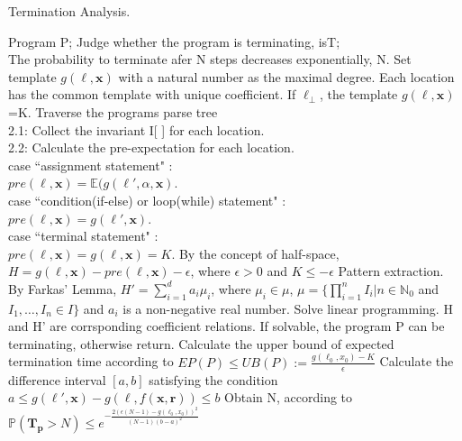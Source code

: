 \documentclass[runningheads]{llncs}
\begin{document}
\begin{algorithm}[htb]  
	\caption{Termination Analysis.}  
	\label{TA}  
	\begin{algorithmic}[1]  
		\REQUIRE 
		Program P; 
		\ENSURE  
		Judge whether the program is terminating, isT;\\
		The probability to terminate afer N steps decreases exponentially, N.
		\STATE Set template $g(\ell,\boldsymbol{x})$ with a natural number as the maximal degree. Each location has the common template with unique coefficient. If $\ell_{\bot}$, the template $g(\ell,\boldsymbol{x})$=K.
		\STATE Traverse the programs parse tree \\
		2.1: Collect the invariant I[ ] for each location.\\
		2.2: Calculate the pre-expectation for each location.\\
		\quad \quad case ``assignment statement" :\\
		\quad \quad \quad \quad $pre(\ell,\boldsymbol{x})= \mathbb{E}(g(\ell',\alpha,\boldsymbol{x})$.\\
		\quad \quad case ``condition(if-else) or loop(while) statement" :\\
		\quad \quad \quad \quad $pre(\ell,\boldsymbol{x})=g(\ell',\boldsymbol{x})$.\\
		\quad \quad case ``terminal statement" :\\
		\quad \quad \quad \quad $pre(\ell,\boldsymbol{x})=g(\ell,\boldsymbol{x})=K$.
		\STATE By the concept of half-space, $H=g(\ell,\boldsymbol{x})-pre(\ell,\boldsymbol{x})-\epsilon$, where $\epsilon >0$ and $K \leq -\epsilon$
		\STATE Pattern extraction. By Farkas' Lemma, $H'=\sum\limits_{i=1}^{d} a_i \mu_i$, where $\mu_i \in \mu$, $\mu=\{\prod\limits_{i=1}^{n} I_i | n\in\mathbb{N}_0$ and $ I_1,\dots,I_n \in I\}$ and $a_i$ is a non-negative real number.
		\STATE Solve linear programming. H and H' are corrsponding coefficient relations. If solvable, the program P can be terminating, otherwise return.
		\STATE Calculate the upper bound of expected termination time according to $EP(P)\leq UB(P):=\frac{g(\ell_0,x_0)-K}{\epsilon}$
		\STATE Calculate the difference interval $[a,b]$ satisfying the condition $a\leq g(\ell',\boldsymbol{x})-g(\ell,f(\boldsymbol{x},\boldsymbol{r}))\leq b$
		\STATE Obtain N, according to $\mathbb{P}(\bm{T_p} > N) \leq e^{-\frac{2(\epsilon(N-1)-g(\ell_0,x_0))^2}{(N-1)(b-a)^2}}$
	\end{algorithmic}  
\end{algorithm}  
\end{document}
